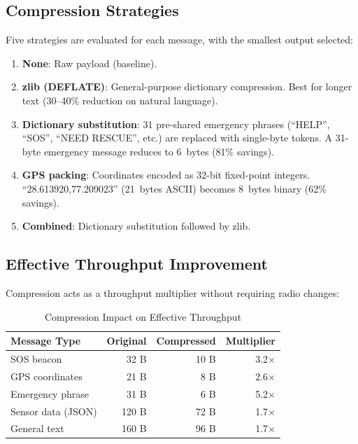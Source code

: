 \documentclass[11pt,a4paper]{article}
\begin{document}
\subsection{Compression Strategies}

Five strategies are evaluated for each message, with the smallest output selected:

\begin{enumerate}
    \item \textbf{None}: Raw payload (baseline).
    \item \textbf{zlib (DEFLATE)}: General-purpose dictionary compression. Best for longer text (30--40\% reduction on natural language).
    \item \textbf{Dictionary substitution}: 31 pre-shared emergency phrases (``HELP'', ``SOS'', ``NEED RESCUE'', etc.) are replaced with single-byte tokens. A 31-byte emergency message reduces to 6~bytes (81\% savings).
    \item \textbf{GPS packing}: Coordinates encoded as 32-bit fixed-point integers. ``28.613920,77.209023'' (21~bytes ASCII) becomes 8~bytes binary (62\% savings).
    \item \textbf{Combined}: Dictionary substitution followed by zlib.
\end{enumerate}

\subsection{Effective Throughput Improvement}

Compression acts as a throughput multiplier without requiring radio changes:

\begin{table}[H]
\centering
\caption{Compression Impact on Effective Throughput}
\begin{tabular}{lrrr}
\toprule
\textbf{Message Type} & \textbf{Original} & \textbf{Compressed} & \textbf{Multiplier} \\
\midrule
SOS beacon & 32 B & 10 B & 3.2$\times$ \\
GPS coordinates & 21 B & 8 B & 2.6$\times$ \\
Emergency phrase & 31 B & 6 B & 5.2$\times$ \\
Sensor data (JSON) & 120 B & 72 B & 1.7$\times$ \\
General text & 160 B & 96 B & 1.7$\times$ \\
\bottomrule
\end{tabular}
\end{table}
\end{document}
